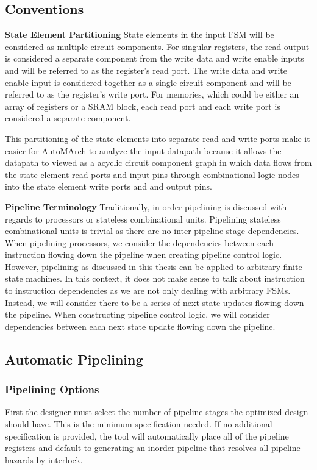 \subsection{Conventions}
{\bf State Element Partitioning}
State elements in the input FSM will be considered as multiple circuit components. For singular registers, the read output is considered a separate component from the write data and write enable inputs and will be referred to as the register's read port. The write data and write enable input is considered together as a single circuit component and will be referred to as the register's write port. For memories, which could be either an array of registers or a SRAM block, each read port and each write port is considered a separate component. 

This partitioning of the state elements into separate read and write ports make it easier for AutoMArch to analyze the input datapath because it allows the datapath to viewed as a acyclic circuit component graph in which data flows from the state element read ports and input pins through combinational logic nodes into the state element write ports and and output pins.

{\bf Pipeline Terminology}
Traditionally, in order pipelining is discussed with regards to processors or stateless combinational units. Pipelining stateless combinational units is trivial as there are no inter-pipeline stage dependencies. When pipelining processors, we consider the dependencies between each instruction flowing down the pipeline when creating pipeline control logic. However, pipelining as discussed in this thesis can be applied to arbitrary finite state machines. In this context, it does not make sense to talk about instruction to instruction dependencies as we are not only dealing with arbitrary FSMs. Instead, we will consider there to be a series of next state updates flowing down the pipeline. When constructing pipeline control logic, we will consider dependencies between each next state update flowing down the pipeline.

\subsection{Automatic Pipelining}
\subsubsection{Pipelining Options}
First the designer must select the number of pipeline stages the optimized design should have. This is the minimum specification needed. If no additional specification is provided, the tool will automatically place all of the pipeline registers and default to generating an inorder pipeline that resolves all pipeline hazards by interlock.

